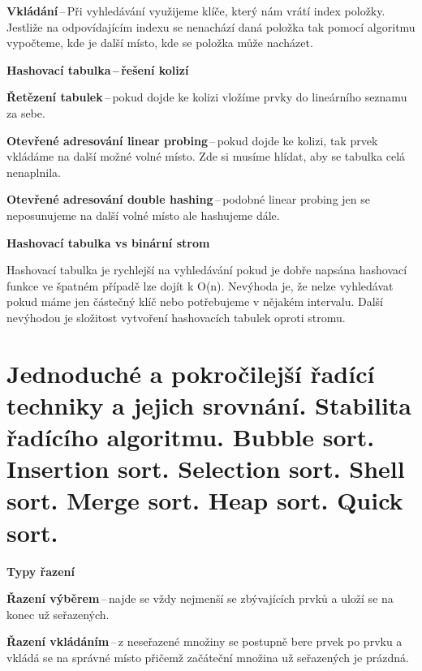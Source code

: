 \textbf{Vkládání}\,--\,Při vyhledávání využijeme klíče, který nám vrátí index položky. Jestliže na odpovídajícím indexu se nenachází daná položka tak pomocí algoritmu vypočteme, kde je další místo, kde se položka může nacházet.

\begin{Large}\vspace{0,5cm} \textbf{Hashovací tabulka\,--\,řešení kolizí}
\end{Large}

\textbf{Řetězení tabulek}\,--\,pokud dojde ke kolizi vložíme prvky do lineárního seznamu za sebe.

\textbf{Otevřené adresování linear probing}\,--\,pokud dojde ke kolizi, tak prvek vkládáme na další možné volné místo. Zde si musíme hlídat, aby se tabulka celá nenaplnila.

\textbf{Otevřené adresování double hashing}\,--\,podobné linear probing jen se neposunujeme na další volné místo ale hashujeme dále.

\begin{Large}\vspace{0,5cm} \textbf{Hashovací tabulka vs binární strom}
\end{Large}

Hashovací tabulka je rychlejší na vyhledávání pokud je dobře napsána hashovací funkce ve špatném případě lze dojít k O(n). Nevýhoda je, že nelze vyhledávat pokud máme jen částečný klíč nebo potřebujeme v nějakém intervalu. Další nevýhodou je složitost vytvoření hashovacích tabulek oproti stromu.










\newpage
\section{Jednoduché a pokročilejší řadící techniky a jejich srovnání. Stabilita řadícího algoritmu. Bubble sort. Insertion sort. Selection sort. Shell sort. Merge sort. Heap sort. Quick sort.}

\begin{Large}\vspace{0,5cm} \textbf{Typy řazení}
\end{Large}

\textbf{Řazení výběrem}\,--\,najde se vždy nejmenší se zbývajících prvků a uloží se na konec už seřazených.

\textbf{Řazení vkládáním}\,--\,z neseřazené množiny se postupně bere prvek po prvku a vkládá se na správné místo přičemž začáteční množina už seřazených je prázdná.

